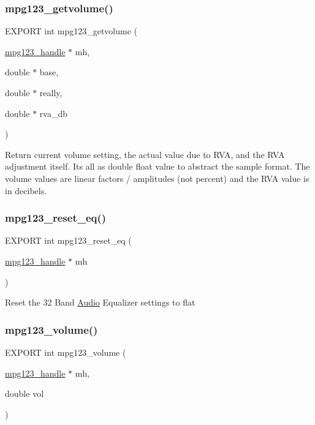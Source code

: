 \subsubsection{\texorpdfstring{mpg123\+\_\+getvolume()}{mpg123\_getvolume()}}
{\footnotesize\ttfamily E\+X\+P\+O\+RT int mpg123\+\_\+getvolume (\begin{DoxyParamCaption}\item[{\hyperlink{group__mpg123__init_ga6728e2839a395f3a07d4514da659faca}{mpg123\+\_\+handle} $\ast$}]{mh,  }\item[{double $\ast$}]{base,  }\item[{double $\ast$}]{really,  }\item[{double $\ast$}]{rva\+\_\+db }\end{DoxyParamCaption})}

Return current volume setting, the actual value due to R\+VA, and the R\+VA adjustment itself. It\textquotesingle{}s all as double float value to abstract the sample format. The volume values are linear factors / amplitudes (not percent) and the R\+VA value is in decibels. \mbox{\label{group__mpg123__voleq_gaef321456fd43bbe9d52a5f507cc83d9b}} 
\subsubsection{\texorpdfstring{mpg123\+\_\+reset\+\_\+eq()}{mpg123\_reset\_eq()}}
{\footnotesize\ttfamily E\+X\+P\+O\+RT int mpg123\+\_\+reset\+\_\+eq (\begin{DoxyParamCaption}\item[{\hyperlink{group__mpg123__init_ga6728e2839a395f3a07d4514da659faca}{mpg123\+\_\+handle} $\ast$}]{mh }\end{DoxyParamCaption})}

Reset the 32 Band \hyperlink{classAudio}{Audio} Equalizer settings to flat \mbox{\label{group__mpg123__voleq_ga16fcff6db0bffbbc4341c07e373d3bd7}} 
\subsubsection{\texorpdfstring{mpg123\+\_\+volume()}{mpg123\_volume()}}
{\footnotesize\ttfamily E\+X\+P\+O\+RT int mpg123\+\_\+volume (\begin{DoxyParamCaption}\item[{\hyperlink{group__mpg123__init_ga6728e2839a395f3a07d4514da659faca}{mpg123\+\_\+handle} $\ast$}]{mh,  }\item[{double}]{vol }\end{DoxyParamCaption})}

